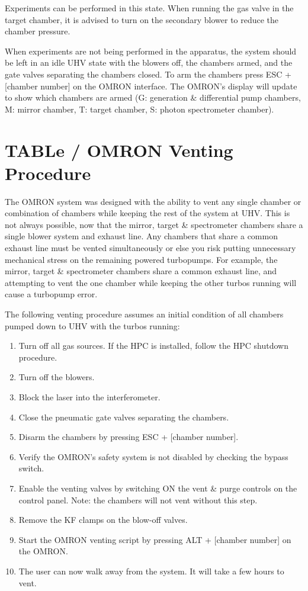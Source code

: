 Experiments can be performed in this state. When running the gas valve in the target chamber, it is advised to turn on the secondary blower to reduce the chamber pressure.

When experiments are not being performed in the apparatus, the system should be left in an idle UHV state with the blowers off, the chambers armed, and the gate valves separating the chambers closed. To arm the chambers press ESC + [chamber number] on the OMRON interface. The OMRON's display will update to show which chambers are armed (G: generation \& differential pump chambers, M: mirror chamber, T: target chamber, S: photon spectrometer chamber).

\section{TABLe / OMRON Venting Procedure}
\label{sec:OMRON_venting}

The OMRON system was designed with the ability to vent any single chamber or combination of chambers while keeping the rest of the system at UHV. This is not always possible, now that the mirror, target \& spectrometer chambers share a single blower system and exhaust line. Any chambers that share a common exhaust line must be vented simultaneously or else you risk putting unnecessary mechanical stress on the remaining powered turbopumps. For example, the mirror, target \& spectrometer chambers share a common exhaust line, and attempting to vent the one chamber while keeping the other turbos running will cause a turbopump error.

The following venting procedure assumes an initial condition of all chambers pumped down to UHV with the turbos running:

\begin{enumerate}
	\item Turn off all gas sources. If the HPC is installed, follow the HPC shutdown procedure.
	\item Turn off the blowers.
	\item Block the laser into the interferometer.
	\item Close the pneumatic gate valves separating the chambers.
	\item Disarm the chambers by pressing ESC + [chamber number].
	\item Verify the OMRON's safety system is not disabled by checking the bypass switch.
	\item Enable the venting valves by switching ON the vent \& purge controls on the control panel. Note: the chambers will not vent without this step.
	\item Remove the KF clamps on the blow-off valves.
	\item Start the OMRON venting script by pressing ALT + [chamber number] on the OMRON.
	\item The user can now walk away from the system. It will take a few hours to vent.
\end{enumerate}

